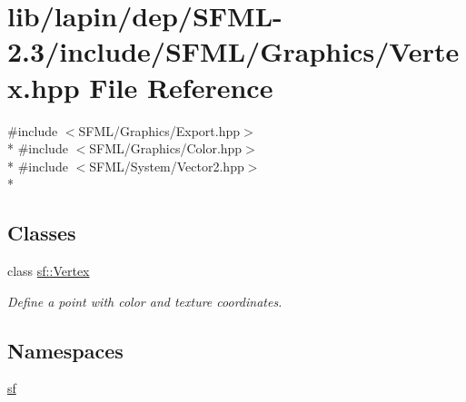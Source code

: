 \hypertarget{lapin_2dep_2_s_f_m_l-2_83_2include_2_s_f_m_l_2_graphics_2_vertex_8hpp}{\section{lib/lapin/dep/\-S\-F\-M\-L-\/2.3/include/\-S\-F\-M\-L/\-Graphics/\-Vertex.hpp File Reference}
\label{lapin_2dep_2_s_f_m_l-2_83_2include_2_s_f_m_l_2_graphics_2_vertex_8hpp}
}
{\ttfamily \#include $<$S\-F\-M\-L/\-Graphics/\-Export.\-hpp$>$}\\*
{\ttfamily \#include $<$S\-F\-M\-L/\-Graphics/\-Color.\-hpp$>$}\\*
{\ttfamily \#include $<$S\-F\-M\-L/\-System/\-Vector2.\-hpp$>$}\\*
\subsection*{Classes}
\begin{DoxyCompactItemize}
\item 
class \hyperlink{classsf_1_1_vertex}{sf\-::\-Vertex}
\begin{DoxyCompactList}\small\item\em Define a point with color and texture coordinates. \end{DoxyCompactList}\end{DoxyCompactItemize}
\subsection*{Namespaces}
\begin{DoxyCompactItemize}
\item 
\hyperlink{namespacesf}{sf}
\end{DoxyCompactItemize}
